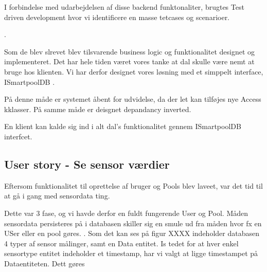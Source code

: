 I forbindelse med udarbejdelsen af disse backend funktonaliter, brugtes Test driven development hvor vi identificere en masse tetcases og scenarioer.

.

Som de blev slrevet blev tilsvarende business logic og funktionalitet designet og implementeret.
Det har hele tiden været vores tanke at dal skulle være nemt at bruge hos klienten. Vi har derfor designet vores løsning med et simppelt interface, ISmartpoolDB .

På denne måde er systemet åbent for udvidelse, da der let kan tilføjes nye Access kklasser. På samme måde er deisgnet depandancy inverted.

En klient kan kalde sig ind i alt dal's funktionalitet gennem ISmartpoolDB interfcet.



\subsection{User story - Se sensor værdier}

Eftersom funktionalitet til oprettelse af bruger og Pools blev laveet, var  det tid til at gå i gang med sensordata ting.

Dette var 3 fase, og vi havde derfor en fuldt fungerende User og Pool. Måden sensordata persisteres på i databasen skiller sig en smule ud fra måden hvor fx en USer eller en pool gøres. . Som det kan ses på figur XXXX indeholder databasen 4 typer af sensor målinger, samt en Data entitet. Is tedet for at hver enkel sensortype entitet indeholder et timestamp, har vi valgt at ligge timestampet på Dataentiteten. Dett gøres